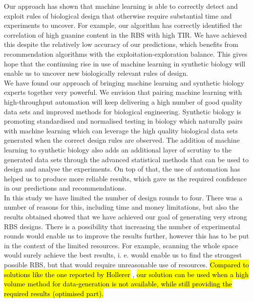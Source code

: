 \documentclass{article}
\begin{document}
Our approach has shown that machine learning is able to correctly detect and exploit rules of biological design that otherwise require substantial time and experiments to uncover.
For example, our algorithm has correctly identified the correlation of high guanine content in the RBS with high TIR.
We have achieved this despite the relatively low accuracy of our predictions, which benefits from recommendation algorithms with the exploitation-exploration balance.
This gives hope that the continuing rise in use of machine learning in synthetic biology will enable us to uncover new biologically relevant rules of design.\\

We have found our approach of bringing machine learning and synthetic biology experts together very powerful.
We envision that pairing machine learning with high-throughput automation will keep delivering a high number of good quality data sets and improved methods for biological engineering.
Synthetic biology is promoting standardised and normalised testing in biology which naturally pairs with machine learning which can leverage the high quality biological data sets generated when the correct design rules are observed.
The addition of machine learning to synthetic biology also adds an additional layer of scrutiny to the generated data sets through the advanced statistical methods that can be used to design and analyse the experiments.
On top of that, the use of automation has helped us to produce more reliable results, which gave us the required confidence in our predictions and recommendations.\\

In this study we have limited the number of design rounds to four.
There was a number of reasons for this, including time and money limitations, but also the results obtained showed that we have achieved our goal of generating very strong RBS designs.
There is a possibility that increasing the number of experimental rounds would enable us to improve the results further, however this has to be put in the context of the limited resources.
For example, scanning the whole space would surely achieve the best results, i. e. would enable us to find the strongest possible RBS, but that would require unreasonable use of resources.
\hl{Compared to solutions like the one reported by Hollerer} \cite{Hollerer2020}, \hl{our solution can be used when a high volume method for data-generation is not available, while still providing the required results (optimised part).} \\
\end{document}
